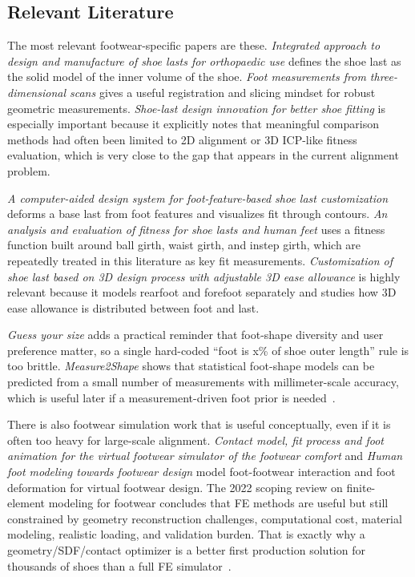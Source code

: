 \documentclass[11pt]{article}
\begin{document}
\subsection{Relevant Literature}

The most relevant footwear-specific papers are these. \emph{Integrated approach to design and manufacture of shoe lasts for orthopaedic use} defines the shoe last as the solid model of the inner volume of the shoe. \emph{Foot measurements from three-dimensional scans} gives a useful registration and slicing mindset for robust geometric measurements. \emph{Shoe-last design innovation for better shoe fitting} is especially important because it explicitly notes that meaningful comparison methods had often been limited to 2D alignment or 3D ICP-like fitness evaluation, which is very close to the gap that appears in the current alignment problem.

\emph{A computer-aided design system for foot-feature-based shoe last customization} deforms a base last from foot features and visualizes fit through contours. \emph{An analysis and evaluation of fitness for shoe lasts and human feet} uses a fitness function built around ball girth, waist girth, and instep girth, which are repeatedly treated in this literature as key fit measurements. \emph{Customization of shoe last based on 3D design process with adjustable 3D ease allowance} is highly relevant because it models rearfoot and forefoot separately and studies how 3D ease allowance is distributed between foot and last.

\emph{Guess your size} adds a practical reminder that foot-shape diversity and user preference matter, so a single hard-coded ``foot is x\% of shoe outer length'' rule is too brittle. \emph{Measure2Shape} shows that statistical foot-shape models can be predicted from a small number of measurements with millimeter-scale accuracy, which is useful later if a measurement-driven foot prior is needed~\cite{bao-last,luximon-last,cad-last,fitness-lasts,ease-allowance,guess-size,measure2shape,feature-last}.

There is also footwear simulation work that is useful conceptually, even if it is often too heavy for large-scale alignment. \emph{Contact model, fit process and foot animation for the virtual footwear simulator of the footwear comfort} and \emph{Human foot modeling towards footwear design} model foot-footwear interaction and foot deformation for virtual footwear design. The 2022 scoping review on finite-element modeling for footwear concludes that FE methods are useful but still constrained by geometry reconstruction challenges, computational cost, material modeling, realistic loading, and validation burden. That is exactly why a geometry/SDF/contact optimizer is a better first production solution for thousands of shoes than a full FE simulator~\cite{fe-review,virtual-footwear,human-foot-modeling}.
\end{document}
